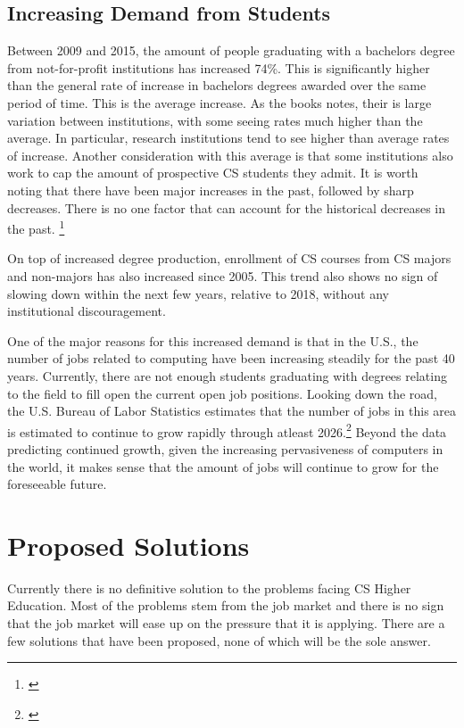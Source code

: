 \documentclass[12pt,twoside]{reedthesis}
\begin{document}
\subsection{Increasing Demand from Students}
Between 2009 and 2015, the amount of people graduating with a bachelors degree from not-for-profit institutions has increased 74\%. This is significantly higher than the general rate of increase in bachelors degrees awarded over the same period of time. This is the average increase. As the books notes, their is large variation between institutions, with some seeing rates much higher than the average. In particular, research institutions tend to see higher than average rates of increase. Another consideration with this average is that some institutions also work to cap the amount of prospective CS students they admit. It is worth noting that there have been major increases in the past, followed by sharp decreases. There is no one factor that can account for the historical decreases in the past.  \footnote{\cite{committee_on_the_growth_of_computer_science_undergraduate_enrollments_assessing_2018}} 

On top of increased degree production, enrollment of CS courses from CS majors and non-majors has also increased since 2005. This trend also shows no sign of slowing down within the next few years, relative to 2018, without any institutional discouragement. 

One of the major reasons for this increased demand is that in the U.S.,  the number of jobs related to computing have been increasing steadily for the past 40 years. Currently, there are not enough students graduating with degrees relating to the field to fill open the current open job positions. Looking down the road, the U.S. Bureau of Labor Statistics estimates that the number of jobs in this area is estimated to continue to grow rapidly through atleast 2026.\footnote{\cite{BLS}} Beyond the data predicting continued growth, given the increasing pervasiveness of computers in the world, it makes sense that the amount of jobs will continue to grow for the foreseeable future. 

\section{Proposed Solutions}

Currently there is no definitive solution to the problems facing CS Higher Education. Most of the problems stem from the job market and there is no sign that the job market will ease up on the pressure that it is applying. There are a few solutions that have been proposed, none of which will be the sole answer.
\end{document}
